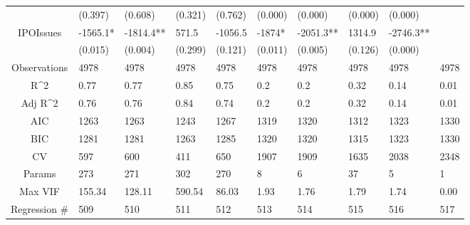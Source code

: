 \documentclass{article}
\begin{document}
\begin{table}[H]
\begin{tabular}{|clllllllll|}
   & (0.397) & (0.608) & (0.321) & (0.762) & (0.000) & (0.000) & (0.000) & (0.000) &  \\ 
  IPOIssues & -1565.1* & -1814.4** & 571.5 & -1056.5 & -1874* & -2051.3** & 1314.9 & -2746.3** &  \\ 
   & (0.015) & (0.004) & (0.299) & (0.121) & (0.011) & (0.005) & (0.126) & (0.000) &  \\ 
  \hline 
 Observations & 4978 & 4978 & 4978 & 4978 & 4978 & 4978 & 4978 & 4978 & 4978 \\ 
  R^2 & 0.77 & 0.77 & 0.85 & 0.75 & 0.2 & 0.2 & 0.32 & 0.14 & 0.01 \\ 
  Adj R^2 & 0.76 & 0.76 & 0.84 & 0.74 & 0.2 & 0.2 & 0.32 & 0.14 & 0.01 \\ 
  AIC & 1263 & 1263 & 1243 & 1267 & 1319 & 1320 & 1312 & 1323 & 1330 \\ 
  BIC & 1281 & 1281 & 1263 & 1285 & 1320 & 1320 & 1315 & 1323 & 1330 \\ 
  CV & 597 & 600 & 411 & 650 & 1907 & 1909 & 1635 & 2038 & 2348 \\ 
  Params & 273 & 271 & 302 & 270 & 8 & 6 & 37 & 5 & 1 \\ 
  Max VIF & 155.34 & 128.11 & 590.54 & 86.03 & 1.93 & 1.76 & 1.79 & 1.74 & 0.00 \\ 
  Regression \# & 509 & 510 & 511 & 512 & 513 & 514 & 515 & 516 & 517 \\ 
   \hline
\end{tabular}
 
\end{table}
\end{document}
